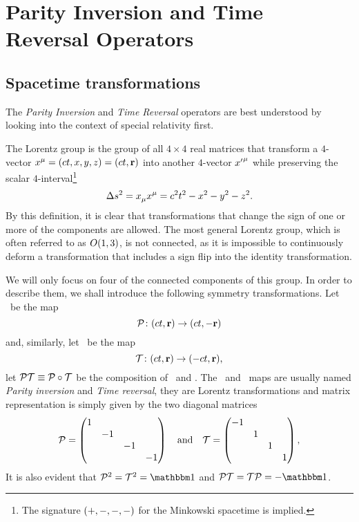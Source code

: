\chapter{Parity Inversion and Time Reversal Operators}\label{ch:pt-operators}
    \section{Spacetime transformations}\label{s:spacetime-transformations}
        The \emph{Parity Inversion} and \emph{Time Reversal} operators are best understood by looking into the context of special relativity first.

        The Lorentz group is the group of all $4\times4$ real matrices that transform a $4$-vector $\tensor{x}{^\mu} = \pqty{ct,x,y,z} = \pqty{ct,\vb{r}}$ into another $4$-vector $\tensor{{x'}}{^\mu}$ while preserving the scalar $4$-interval\footnote{The signature $\pqty{+,-,-,-}$ for the Minkowski spacetime is implied.}
        \begin{equation}
            \label{eq:4-interval}
            \Delta s^2
            = \tensor{x}{_\mu} \tensor{x}{^\mu}
            = c^2t^2 - x^2 - y^2 - z^2
            \myperiod
        \end{equation}
        By this definition, it is clear that transformations that change the sign of one or more of the components are allowed. The most general Lorentz group, which is often referred to as $O\pqty{1,3}$, is not connected, as it is impossible to continuously deform a transformation that includes a sign flip into the identity transformation.

        We will only focus on four of the connected components of this group. In order to describe them, we shall introduce the following symmetry transformations. Let \mcP\ be the map 
        \begin{equation}
            \label{eq:lorentz-P}
            \func{\mcP}{\pqty{ct,\vb{r}}}{\pqty{ct,-\vb{r}}}
        \end{equation}
        and, similarly, let \mcT\ be the map
        \begin{equation}
            \label{eq:lorentz-T}
            \func{\mcT}{\pqty{ct,\vb{r}}}{\pqty{-ct,\vb{r}}}
            \mycomma
        \end{equation}
        let $\mathcal{P}\mathcal{T} \equiv \mathcal{P}\circ\mathcal{T}$ be the composition of \mcP\ and \mcT.
        The \mcP\ and \mcT\ maps are usually named \emph{Parity inversion} and \emph{Time reversal}, they are Lorentz transformations and matrix representation is simply given by the two diagonal matrices
        \begin{equation*}
            \mcP = \pmqty{\dmat{1,-1,-1,-1}}
            \qand
            \mcT = \pmqty{\dmat{-1,1,1,1}}
            \mycomma
        \end{equation*}
        It is also evident that $\mcP^2 = \mcT^2 = \idM$ and $\PT = \mcT\mcP = -\idM$.
        
